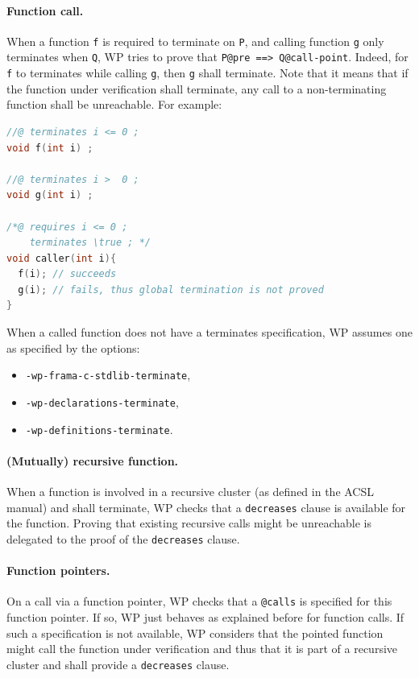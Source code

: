 \paragraph{Function call.} When a function \verb+f+ is required to terminate on
\verb+P+, and calling function \verb+g+ only terminates when \verb+Q+, WP tries to
prove that \verb+P@pre ==> Q@call-point+. Indeed, for \verb+f+ to terminates while calling
\verb+g+, then \verb+g+ shall terminate. Note that it
means that if the function under verification shall terminate, any call to a
non-terminating function shall be unreachable. For example:

\begin{lstlisting}[language=c, alsolanguage=acsl]
//@ terminates i <= 0 ;
void f(int i) ;

//@ terminates i >  0 ;
void g(int i) ;

/*@ requires i <= 0 ;
    terminates \true ; */
void caller(int i){
  f(i); // succeeds
  g(i); // fails, thus global termination is not proved
}
\end{lstlisting}

When a called function does not have a terminates specification, WP assumes one
as specified by the options:

\begin{itemize}
\item \verb+-wp-frama-c-stdlib-terminate+,
\item \verb+-wp-declarations-terminate+,
\item \verb+-wp-definitions-terminate+.
\end{itemize}

\paragraph{(Mutually) recursive function.} When a function is involved in a
recursive cluster (as defined in the ACSL manual) and shall terminate, WP checks that a
\verb+decreases+ clause is available for the function. Proving that existing
recursive calls might be unreachable is delegated to the proof of the
\verb+decreases+ clause.

\paragraph{Function pointers. } On a call via a function pointer, WP checks that
a \verb+@calls+ is specified for this function pointer. If so, WP just behaves
as explained before for function calls. If such a specification is not available,
WP considers that the pointed function might call the function under
verification and thus that it is part of a recursive cluster and shall provide
a \verb+decreases+ clause.


